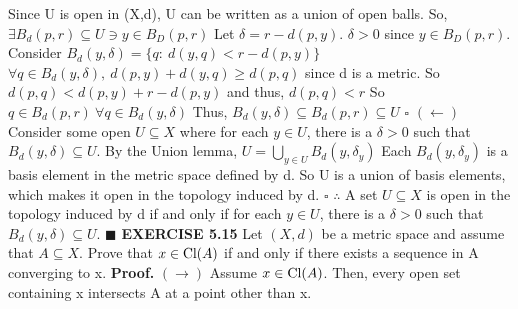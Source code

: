 \documentclass[12pt]{article}
\begin{document}
  Since U is open in (X,d), U can be written as a union of open balls.
  \newline
  So, \(\exists B_d(p,r) \subseteq U \ni y \in B_D(p,r)\)
  \newline \newline
  Let \(\delta = r - d(p,y)\).
  \newline
  \(\delta > 0\) since \(y \in B_D(p,r)\).
  \newline
  Consider \(B_d(y,\delta) = \{q:\ d(y,q) < r - d(p,y)\}\)
  \newline \newline
  \(\forall q \in B_d(y, \delta),\ d(p,y) + d(y,q) \geq d(p,q)\) since d is a metric.
  \newline
  So \(d(p,q) < d(p,y) + r - d(p,y)\) and thus, \(d(p,q) < r\)
  \newline
  So \(q \in B_d(p,r)\ \forall q \in B_d(y,\delta)\)
  \newline
  Thus, \(B_d(y,\delta) \subseteq B_d(p,r) \subseteq U\)
  \newline \(\square\) \newline
  \((\leftarrow)\) Consider some open \(U \subseteq X\) where for each \(y \in U\), there is a \(\delta > 0\) such that \(B_d(y,\delta) \subseteq U\).
  \newline
  By the Union lemma, \(U = \bigcup_{y \in U}B_d(y,\delta_y)\)
  \newline
  Each \(B_d(y, \delta_y)\) is a basis element in the metric space defined by d.
  \newline
  So U is a union of basis elements, which makes it open in the topology induced by d.
  \newline \(\square\) \newline
  \(\therefore\) A set \(U \subseteq X\) is open in the topology induced by d if and only if for each \(y \in U\), there is a \(\delta > 0\) such that \(B_d(y,\delta) \subseteq U\).
  \newline \(\blacksquare\)
  \newpage
  \noindent
  \textbf{EXERCISE 5.15}
  \newline
  Let \((X,d)\) be a metric space and assume that \(A \subseteq X\). Prove that \(x \in \textup{Cl}(A)\) if and only if there exists a sequence in A converging to x.
  \newline \newline
  \textbf{Proof.}
  \newline
  \((\rightarrow)\) Assume \(x \in \textup{Cl}(A)\).
  \newline
  Then, every open set containing x intersects A at a point other than x.
\end{document}
